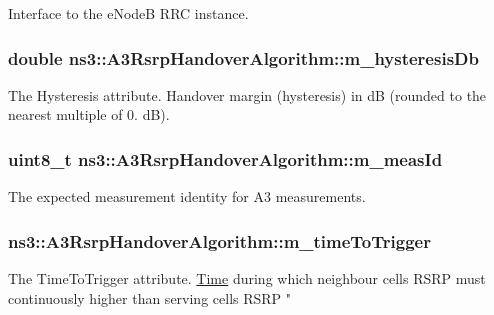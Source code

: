 Interface to the e\+NodeB R\+RC instance. 

\subsubsection[{\texorpdfstring{m\+\_\+hysteresis\+Db}{m_hysteresisDb}}]{\setlength{\rightskip}{0pt plus 5cm}double ns3\+::\+A3\+Rsrp\+Handover\+Algorithm\+::m\+\_\+hysteresis\+Db\hspace{0.3cm}{\ttfamily [private]}}\hypertarget{classns3_1_1A3RsrpHandoverAlgorithm_a2554a9c093c29f93f40efd6778d12a75}{}\label{classns3_1_1A3RsrpHandoverAlgorithm_a2554a9c093c29f93f40efd6778d12a75}
The {\ttfamily Hysteresis} attribute. Handover margin (hysteresis) in dB (rounded to the nearest multiple of 0. dB). 
\subsubsection[{\texorpdfstring{m\+\_\+meas\+Id}{m_measId}}]{\setlength{\rightskip}{0pt plus 5cm}uint8\+\_\+t ns3\+::\+A3\+Rsrp\+Handover\+Algorithm\+::m\+\_\+meas\+Id\hspace{0.3cm}{\ttfamily [private]}}\hypertarget{classns3_1_1A3RsrpHandoverAlgorithm_a96ba4646b316fc823618934a7a6d4aa1}{}\label{classns3_1_1A3RsrpHandoverAlgorithm_a96ba4646b316fc823618934a7a6d4aa1}


The expected measurement identity for A3 measurements. 

\subsubsection[{\texorpdfstring{m\+\_\+time\+To\+Trigger}{m_timeToTrigger}}]{ ns3\+::\+A3\+Rsrp\+Handover\+Algorithm\+::m\+\_\+time\+To\+Trigger\hspace{0.3cm}{\ttfamily [private]}}\hypertarget{classns3_1_1A3RsrpHandoverAlgorithm_a5158741f07ce566b8efc01f5e798ae78}{}\label{classns3_1_1A3RsrpHandoverAlgorithm_a5158741f07ce566b8efc01f5e798ae78}
The {\ttfamily Time\+To\+Trigger} attribute. \hyperlink{classns3_1_1Time}{Time} during which neighbour cell\textquotesingle{}s R\+S\+RP must continuously higher than serving cell\textquotesingle{}s R\+S\+RP " 

